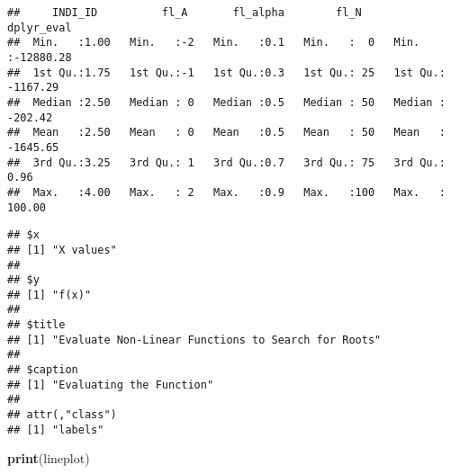 \documentclass[]{article}
\newenvironment{Shaded}{\begin{snugshade}}{\end{snugshade}}
\newcommand{\DataTypeTok}[1]{\textcolor[rgb]{0.13,0.29,0.53}{#1}}
\newcommand{\DecValTok}[1]{\textcolor[rgb]{0.00,0.00,0.81}{#1}}
\newcommand{\KeywordTok}[1]{\textcolor[rgb]{0.13,0.29,0.53}{\textbf{#1}}}
\newcommand{\NormalTok}[1]{#1}
\newcommand{\OperatorTok}[1]{\textcolor[rgb]{0.81,0.36,0.00}{\textbf{#1}}}
\newcommand{\StringTok}[1]{\textcolor[rgb]{0.31,0.60,0.02}{#1}}
\begin{document}
\begin{verbatim}
##     INDI_ID          fl_A       fl_alpha        fl_N       dplyr_eval       
##  Min.   :1.00   Min.   :-2   Min.   :0.1   Min.   :  0   Min.   :-12880.28  
##  1st Qu.:1.75   1st Qu.:-1   1st Qu.:0.3   1st Qu.: 25   1st Qu.: -1167.29  
##  Median :2.50   Median : 0   Median :0.5   Median : 50   Median :  -202.42  
##  Mean   :2.50   Mean   : 0   Mean   :0.5   Mean   : 50   Mean   : -1645.65  
##  3rd Qu.:3.25   3rd Qu.: 1   3rd Qu.:0.7   3rd Qu.: 75   3rd Qu.:     0.96  
##  Max.   :4.00   Max.   : 2   Max.   :0.9   Max.   :100   Max.   :   100.00
\end{verbatim}

\begin{Shaded}
\end{Shaded}

\begin{verbatim}
## $x
## [1] "X values"
## 
## $y
## [1] "f(x)"
## 
## $title
## [1] "Evaluate Non-Linear Functions to Search for Roots"
## 
## $caption
## [1] "Evaluating the Function"
## 
## attr(,"class")
## [1] "labels"
\end{verbatim}

\begin{Shaded}
\begin{Highlighting}[]
\KeywordTok{print}\NormalTok{(lineplot)}
\end{Highlighting}
\end{Shaded}
\end{document}
